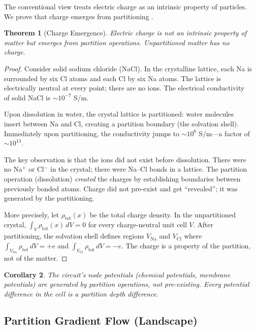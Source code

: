 \documentclass[twocolumn,10pt,a4paper]{article}
\newtheorem{theorem}{Theorem}[section]
\newtheorem{corollary}[theorem]{Corollary}
\theoremstyle{definition}
\theoremstyle{remark}
\begin{document}
The conventional view treats electric charge as an intrinsic property of particles. We prove that charge emerges from partitioning \citep{Sachikonye2024c}.

\begin{theorem}[Charge Emergence]
\label{thm:charge}
Electric charge is not an intrinsic property of matter but emerges from partition operations. Unpartitioned matter has no charge.
\end{theorem}

\begin{proof}
Consider solid sodium chloride (NaCl). In the crystalline lattice, each Na is surrounded by six Cl atoms and each Cl by six Na atoms. The lattice is electrically neutral at every point; there are no ions. The electrical conductivity of solid NaCl is $\sim 10^{-7}$ S/m.

Upon dissolution in water, the crystal lattice is partitioned: water molecules insert between Na and Cl, creating a partition boundary (the solvation shell). Immediately upon partitioning, the conductivity jumps to $\sim 10^{6}$ S/m---a factor of $\sim 10^{13}$.

The key observation is that the ions did not exist before dissolution. There were no Na$^+$ or Cl$^-$ in the crystal; there were Na--Cl bonds in a lattice. The partition operation (dissolution) \emph{created} the charges by establishing boundaries between previously bonded atoms. Charge did not pre-exist and get ``revealed''; it was generated by the partitioning.

More precisely, let $\rho_{\mathrm{tot}}(x)$ be the total charge density. In the unpartitioned crystal, $\int_V \rho_{\mathrm{tot}}(x) \, dV = 0$ for every charge-neutral unit cell $V$. After partitioning, the solvation shell defines regions $V_{\mathrm{Na}}$ and $V_{\mathrm{Cl}}$ where $\int_{V_{\mathrm{Na}}} \rho_{\mathrm{tot}} \, dV = +e$ and $\int_{V_{\mathrm{Cl}}} \rho_{\mathrm{tot}} \, dV = -e$. The charge is a property of the partition, not of the matter.
\end{proof}

\begin{corollary}
\label{cor:circuit_voltages}
The circuit's node potentials (chemical potentials, membrane potentials) are generated by partition operations, not pre-existing. Every potential difference in the cell is a partition depth difference.
\end{corollary}

\subsection{Partition Gradient Flow (Landscape)}
\label{sec:landscape}
\end{document}
